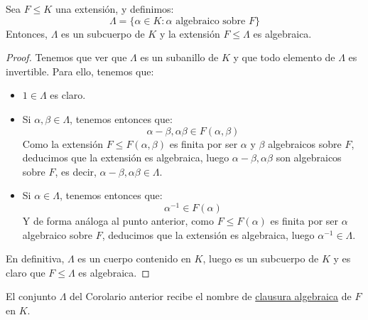 \begin{coro}
    Sea $F\leq K$ una extensión, y definimos:
    \begin{equation*}
        \Lambda = \{\alpha\in K : \alpha \text{\ algebraico sobre\ } F\}
    \end{equation*}
    Entonces, $\Lambda$ es un subcuerpo de $K$ y la extensión $F\leq \Lambda$ es algebraica.
    \begin{proof}
        Tenemos que ver que $\Lambda$ es un subanillo de $K$ y que todo elemento de $\Lambda$ es invertible. Para ello, tenemos que:
        \begin{itemize}
            \item $1\in \Lambda$ es claro.
            \item Si $\alpha,\beta\in \Lambda$, tenemos entonces que:
                \begin{equation*}
                    \alpha-\beta, \alpha\beta\in F(\alpha,\beta)
                \end{equation*}
                Como la extensión $F\leq F(\alpha,\beta)$ es finita por ser $\alpha$ y $\beta$ algebraicos sobre $F$, deducimos que la extensión es algebraica, luego $\alpha-\beta,\alpha\beta$ son algebraicos sobre $F$, es decir, $\alpha-\beta,\alpha\beta\in \Lambda$.
            \item Si $\alpha\in \Lambda$, tenemos entonces que:
                \begin{equation*}
                    \alpha^{-1}\in F(\alpha)
                \end{equation*}
                Y de forma análoga al punto anterior, como $F\leq F(\alpha)$ es finita por ser $\alpha$ algebraico sobre $F$, deducimos que la extensión es algebraica, luego $\alpha^{-1}\in \Lambda$. 
        \end{itemize}
        En definitiva, $\Lambda$ es un cuerpo contenido en $K$, luego es un subcuerpo de $K$ y es claro que $F\leq \Lambda$ es algebraica.
    \end{proof}
\end{coro}

\begin{definicion}
    El conjunto $\Lambda$ del Corolario anterior recibe el nombre de \underline{clausura algebraica} de $F$ en $K$.
\end{definicion}

